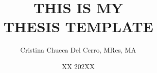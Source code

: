 \documentclass[12pt,crest,nopardent,msfonts,fancychap,hyper,nomencl]{glaphdths}
\author{Cristina Chueca Del Cerro, MRes, MA}
\title{THIS IS MY \\
\LARGE THESIS TEMPLATE}
\date{\MakeUppercase{XX 202XX}}
\begin{document}
\let\cleardoublepage\clearpage



\cleardoublepage%

\startbody







\printbibliography
\end{document}
